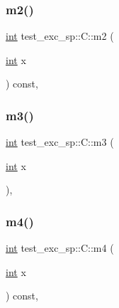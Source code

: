 \subsubsection{\texorpdfstring{m2()}{m2()}}
{\footnotesize\ttfamily \mbox{\hyperlink{warnings_8h_a74f207b5aa4ba51c3a2ad59b219a423b}{int}} test\+\_\+exc\+\_\+sp\+::\+C\+::m2 (\begin{DoxyParamCaption}\item[{\mbox{\hyperlink{warnings_8h_a74f207b5aa4ba51c3a2ad59b219a423b}{int}}}]{x }\end{DoxyParamCaption}) const\hspace{0.3cm}{\ttfamily [inline]}, {\ttfamily [noexcept]}}

\mbox{\label{structtest__exc__sp_1_1_c_ac710cb422450c70585abd1a26641e683}} 
\subsubsection{\texorpdfstring{m3()}{m3()}}
{\footnotesize\ttfamily \mbox{\hyperlink{warnings_8h_a74f207b5aa4ba51c3a2ad59b219a423b}{int}} test\+\_\+exc\+\_\+sp\+::\+C\+::m3 (\begin{DoxyParamCaption}\item[{\mbox{\hyperlink{warnings_8h_a74f207b5aa4ba51c3a2ad59b219a423b}{int}}}]{x }\end{DoxyParamCaption})\hspace{0.3cm}{\ttfamily [inline]}, {\ttfamily [noexcept]}}

\mbox{\label{structtest__exc__sp_1_1_c_a1a5298013346f83e1d5533a37df5f6ab}} 
\subsubsection{\texorpdfstring{m4()}{m4()}}
{\footnotesize\ttfamily \mbox{\hyperlink{warnings_8h_a74f207b5aa4ba51c3a2ad59b219a423b}{int}} test\+\_\+exc\+\_\+sp\+::\+C\+::m4 (\begin{DoxyParamCaption}\item[{\mbox{\hyperlink{warnings_8h_a74f207b5aa4ba51c3a2ad59b219a423b}{int}}}]{x }\end{DoxyParamCaption}) const\hspace{0.3cm}{\ttfamily [inline]}, {\ttfamily [noexcept]}}

